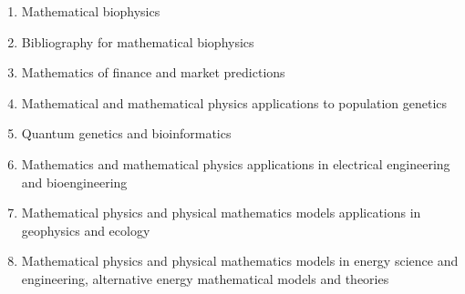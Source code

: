 \documentclass[12pt]{article}
\begin{document}
\begin{enumerate}
\item Mathematical biophysics
\item Bibliography for mathematical biophysics
\item Mathematics of finance and market predictions
\item Mathematical and mathematical physics applications to population genetics
\item Quantum genetics and bioinformatics
\item Mathematics and mathematical physics applications in electrical engineering and bioengineering
\item Mathematical physics and physical mathematics models applications in geophysics and ecology
\item Mathematical physics and physical mathematics models in energy science and engineering, alternative energy mathematical models and theories
\end{enumerate}
\end{document}
